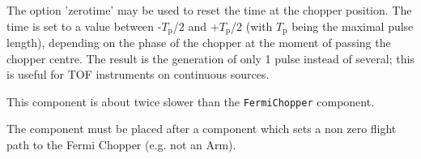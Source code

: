 The option 'zerotime' may be used to reset the time at the chopper position. The time is
set to a value between -$T_\textrm{p}$/2 and +$T_\textrm{p}$/2 (with $T_\textrm{p}$ being the maximal pulse length),
depending on the phase of the chopper at the moment of passing the chopper centre. The
result is the generation of only 1 pulse instead of several; this is useful for TOF instruments
on continuous sources.

This component is about twice slower than the \verb+FermiChopper+ component.

The component must be placed after a component which sets a non zero flight path to the Fermi Chopper (e.g. not an Arm).
